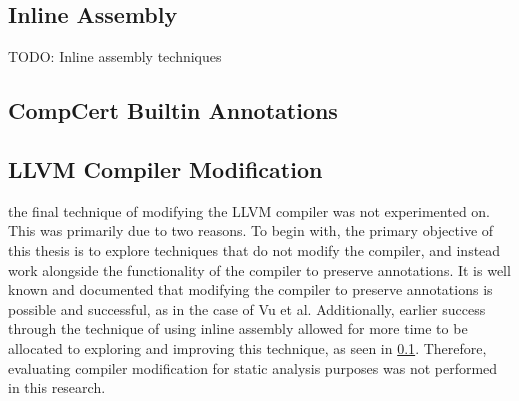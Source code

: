 \subsection{Inline Assembly}
\label{subsec:inlineAssembly}
TODO: Inline assembly techniques

\subsection{CompCert Builtin Annotations}

\subsection{LLVM Compiler Modification}
the final technique of modifying the LLVM compiler was not experimented on. This was primarily due to two reasons. To begin with, the primary objective of this thesis is to explore techniques that do not modify the compiler, and instead work alongside the functionality of the compiler to preserve annotations. It is well known and documented that modifying the compiler to preserve annotations is possible and successful, as in the case of Vu et al. \cite{vu2020secure} Additionally, earlier success through the technique of using inline assembly allowed for more time to be allocated to exploring and improving this technique, as seen in \ref{subsec:inlineAssembly}. Therefore, evaluating compiler modification for static analysis purposes was not performed in this research.

